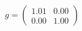\documentclass[preview]{standalone}
\begin{document}
\begin{align*}
g = \begin{pmatrix} 1.01 & 0.00 \\ 0.00 & 1.00 \end{pmatrix}
\end{align*}
\end{document}
